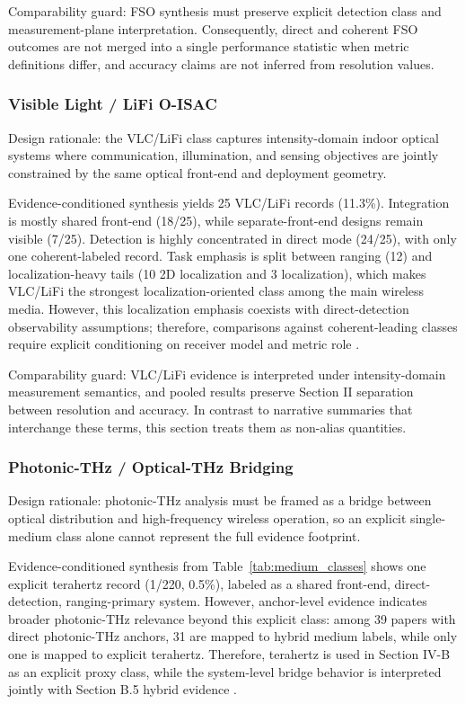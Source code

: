 \documentclass[lettersize,journal]{IEEEtran}
\begin{document}
Comparability guard: FSO synthesis must preserve explicit detection class and measurement-plane interpretation. Consequently, direct and coherent FSO outcomes are not merged into a single performance statistic when metric definitions differ, and accuracy claims are not inferred from resolution values.

\subsubsection{Visible Light / LiFi O-ISAC}
Design rationale: the VLC/LiFi class captures intensity-domain indoor optical systems where communication, illumination, and sensing objectives are jointly constrained by the same optical front-end and deployment geometry.

Evidence-conditioned synthesis yields 25 VLC/LiFi records (11.3\%). Integration is mostly shared front-end (18/25), while separate-front-end designs remain visible (7/25). Detection is highly concentrated in direct mode (24/25), with only one coherent-labeled record. Task emphasis is split between ranging (12) and localization-heavy tails (10 2D localization and 3 localization), which makes VLC/LiFi the strongest localization-oriented class among the main wireless media. However, this localization emphasis coexists with direct-detection observability assumptions; therefore, comparisons against coherent-leading classes require explicit conditioning on receiver model and metric role \cite{O_ISAC_068,O_ISAC_303,O_ISAC_039,O_ISAC_327,O_ISAC_062,O_ISAC_009}.

Comparability guard: VLC/LiFi evidence is interpreted under intensity-domain measurement semantics, and pooled results preserve Section II separation between resolution and accuracy. In contrast to narrative summaries that interchange these terms, this section treats them as non-alias quantities.

\subsubsection{Photonic-THz / Optical-THz Bridging}
Design rationale: photonic-THz analysis must be framed as a bridge between optical distribution and high-frequency wireless operation, so an explicit single-medium class alone cannot represent the full evidence footprint.

Evidence-conditioned synthesis from Table~\ref{tab:medium_classes} shows one explicit terahertz record (1/220, 0.5\%), labeled as a shared front-end, direct-detection, ranging-primary system. However, anchor-level evidence indicates broader photonic-THz relevance beyond this explicit class: among 39 papers with direct photonic-THz anchors, 31 are mapped to hybrid medium labels, while only one is mapped to explicit terahertz. Therefore, terahertz is used in Section IV-B as an explicit proxy class, while the system-level bridge behavior is interpreted jointly with Section B.5 hybrid evidence \cite{O_ISAC_016,O_ISAC_077,O_ISAC_105,O_ISAC_070,O_ISAC_029}.
\end{document}
